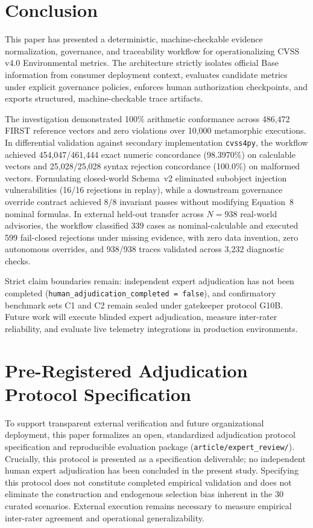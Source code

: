 \documentclass[conference]{IEEEtran}
\begin{document}
\section{Conclusion}

This paper has presented a deterministic, machine-checkable evidence normalization, governance, and traceability workflow for operationalizing CVSS v4.0 Environmental metrics. The architecture strictly isolates official Base information from consumer deployment context, evaluates candidate metrics under explicit governance policies, enforces human authorization checkpoints, and exports structured, machine-checkable trace artifacts.

The investigation demonstrated 100\% arithmetic conformance across 486,472 FIRST reference vectors and zero violations over 10,000 metamorphic executions. In differential validation against secondary implementation \texttt{cvss4py}, the workflow achieved 454,047/461,444 exact numeric concordance (98.3970\%) on calculable vectors and 25,028/25,028 syntax rejection concordance (100.0\%) on malformed vectors. Formulating closed-world Schema~v2 eliminated subobject injection vulnerabilities (16/16 rejections in replay), while a downstream governance override contract achieved 8/8 invariant passes without modifying Equation~8 nominal formulas. In external held-out transfer across $N=938$ real-world advisories, the workflow classified 339 cases as nominal-calculable and executed 599 fail-closed rejections under missing evidence, with zero data invention, zero autonomous overrides, and 938/938 traces validated across 3,232 diagnostic checks.

Strict claim boundaries remain: independent expert adjudication has not been completed (\texttt{human\_adjudication\_completed = false}), and confirmatory benchmark sets C1 and C2 remain sealed under gatekeeper protocol G10B. Future work will execute blinded expert adjudication, measure inter-rater reliability, and evaluate live telemetry integrations in production environments.



\appendices
\section{Pre-Registered Adjudication Protocol Specification}
\label{app:adjudication}

To support transparent external verification and future organizational deployment, this paper formalizes
an open, standardized adjudication protocol specification and reproducible evaluation package
(\texttt{article/expert\_review/}). Crucially, this protocol is presented as a specification deliverable;
no independent human expert adjudication has been concluded in the present study. Specifying
this protocol does not constitute completed empirical validation and does not eliminate the
construction and endogenous selection bias inherent in the 30 curated scenarios. External execution
remains necessary to measure empirical inter-rater agreement and operational generalizability.
\end{document}
